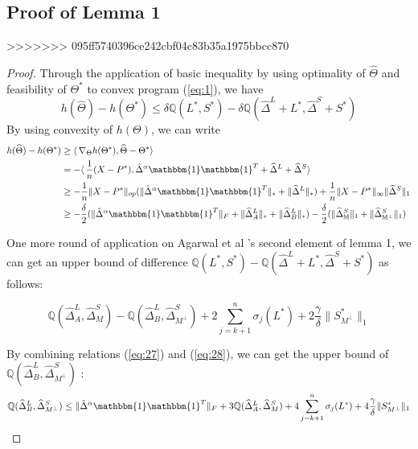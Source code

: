 \documentclass[AMS,STIX1COL]{WileyNJD-v2}
\begin{document}
\subsection{Proof of Lemma 1}
>>>>>>> 095ff5740396ce242cbf04c83b35a1975bbcc870
\begin{proof}
Through the application of basic inequality by using optimality of $\widehat{\Theta}$ and feasibility of $\Theta^{*}$ to convex program (\ref{eq:1}), we have
\begin{equation}
    h(\widehat{\Theta}) - h(\Theta^{*})
    \leq \delta \mathbb{Q}(L^{*},S^{*}) - \delta \mathbb{Q}(\widehat{\Delta}^L + L^{*},\widehat{\Delta}^S + S^{*})
\end{equation}
By using convexity of $h(\Theta)$, we can write
\begin{align}
    h(\widehat{\Theta})-h(\Theta^{*}) &\geq 
    \langle\, \nabla_{\Theta}h(\Theta^{*}),\widehat{\Theta}-\Theta^{*}\rangle\ \nonumber \\
    &= - \langle\,\frac{1}{n} (X-P^{*}), \hat{\Delta}^{\alpha}\mathbbm{1}\mathbbm{1}^T + \widehat{\Delta}^{L} + \widehat{\Delta}^{S} \rangle\ \nonumber \\
    &\geq -\frac{1}{n} \|X - P^*\|_{op}(\|\hat{\Delta}^{\alpha}\mathbbm{1}\mathbbm{1}^T\|_\ast + \|\widehat{\Delta}^{L}\|_\ast) +  \frac{1}{n} \|X - P^*\|_{\infty}\|\widehat{\Delta}^{S}\|_{1} \nonumber \\ 
    &\geq -\frac{\delta}{2}(\|\hat{\Delta}^{\alpha}\mathbbm{1}\mathbbm{1}^T\|_F + \|\widehat{\Delta}^{L}_{A}\|_\ast + \|\widehat{\Delta}^{L}_{B}\|_\ast) - \frac{\delta}{2} (\|\widehat{\Delta}^{S}_{\mathbb{M}}\|_{1} + 
    \|\widehat{\Delta}^{S}_{\mathbb{M^\perp}}\|_{1}) \label{eq:27}
\end{align}

One more round of application on Agarwal et al \cite{agarwal2012noisy}'s second element of lemma 1, 
we can get an upper bound of difference $\mathbb{Q}(L^*,S^*)- \mathbb{Q}(\widehat{\Delta}^L + L^{*},\widehat{\Delta}^S + S^{*})$ as follows:  

\begin{equation} \label{eq:28}
    \mathbb{Q}(\widehat{\Delta}^L_{A},\widehat{\Delta}^S_{M}) - \mathbb{Q}(\widehat{\Delta}^L_{B},\widehat{\Delta}^S_{M^\perp})
    +2 \sum_{j=k+1}^{n} \sigma_{j}(L^*) + 2\frac{\gamma}{\delta}\|S^*_{M^\perp}\|_{1}
\end{equation}

By combining relations (\ref{eq:27}) and (\ref{eq:28}), we can get the upper bound of $\mathbb{Q}(\widehat{\Delta}^L_{B},\widehat{\Delta}^S_{M^\perp})$ : 
\begin{align*}
    \mathbb{Q}(\widehat{\Delta}^L_{B},\widehat{\Delta}^S_{M^\perp}) \leq 
    \|\hat{\Delta}^{\alpha}\mathbbm{1}\mathbbm{1}^T\|_{F} + 
    3\mathbb{Q}(\widehat{\Delta}^{L}_{A},\widehat{\Delta}^{S}_{M})+4 \sum_{j=k+1}^{n} \sigma_{j}(L^{*}) + 4\frac{\gamma}{\delta}   
    \|S^{*}_{M^\perp}\|_{1}
\end{align*}



\end{proof}
\end{document}
